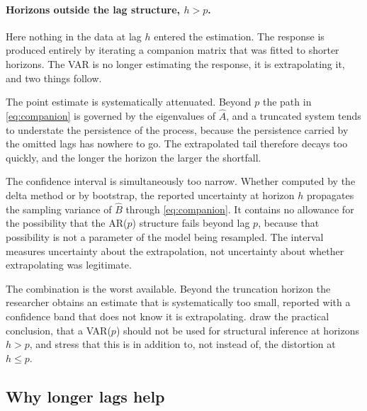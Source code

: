 \paragraph{Horizons outside the lag structure, $h > p$.} Here nothing in the data at lag $h$
entered the estimation. The response is produced entirely by iterating a companion matrix that
was fitted to shorter horizons. The VAR is no longer estimating the response, it is
extrapolating it, and two things follow.

The point estimate is systematically attenuated. Beyond $p$ the path in \eqref{eq:companion} is
governed by the eigenvalues of $\hat{A}$, and a truncated system tends to understate the
persistence of the process, because the persistence carried by the omitted lags has nowhere to
go. The extrapolated tail therefore decays too quickly, and the longer the horizon the larger
the shortfall. 

The confidence interval is simultaneously too narrow. Whether computed by the delta method or
by bootstrap, the reported uncertainty at horizon $h$ propagates the sampling variance of
$\hat{B}$ through \eqref{eq:companion}. It contains no allowance for the possibility that the
AR($p$) structure fails beyond lag $p$, because that possibility is not a parameter of the
model being resampled. The interval measures uncertainty about the extrapolation, not
uncertainty about whether extrapolating was legitimate.

The combination is the worst available. Beyond the truncation horizon the researcher obtains an
estimate that is systematically too small, reported with a confidence band that does not know
it is extrapolating. \citet{Long_Lag2025} draw the practical conclusion, that a VAR($p$) should
not be used for structural inference at horizons $h > p$, and stress that this is in addition
to, not instead of, the distortion at $h \leq p$.


\subsection{Why longer lags help}
\label{sec:whylonger}

